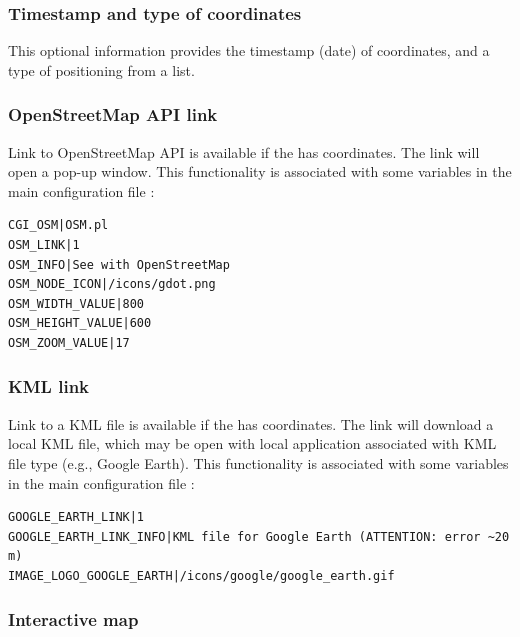\subsubsection{Timestamp and type of coordinates}

This optional information provides the timestamp (date) of coordinates, and a type of positioning from a list.




\subsubsection{OpenStreetMap API link}

Link to OpenStreetMap API is available if the  has coordinates. The link will open a pop-up window. This functionality is associated with some variables in the main configuration file :

\begin{lstlisting}[title=\wofile{WEBOBS.rc} (excerpt)]
CGI_OSM|OSM.pl
OSM_LINK|1
OSM_INFO|See with OpenStreetMap
OSM_NODE_ICON|/icons/gdot.png
OSM_WIDTH_VALUE|800
OSM_HEIGHT_VALUE|600
OSM_ZOOM_VALUE|17
\end{lstlisting}

\subsubsection{KML link}

Link to a KML file is available if the  has coordinates. The link will download a local KML file, which may be open with local application associated with KML file type (e.g., Google Earth). This functionality is associated with some variables in the main configuration file :

\begin{lstlisting}[title=\wofile{WEBOBS.rc} (excerpt)]
GOOGLE_EARTH_LINK|1
GOOGLE_EARTH_LINK_INFO|KML file for Google Earth (ATTENTION: error ~20 m)
IMAGE_LOGO_GOOGLE_EARTH|/icons/google/google_earth.gif
\end{lstlisting}

\subsubsection{Interactive map}

